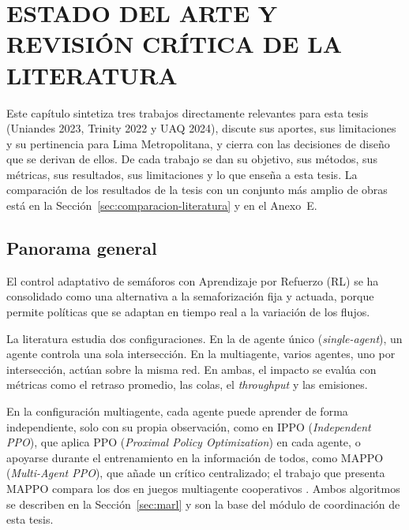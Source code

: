 \chapter{ESTADO DEL ARTE Y REVISIÓN CRÍTICA DE LA LITERATURA}
\label{cap:estado-arte}

Este capítulo sintetiza tres trabajos directamente relevantes para esta tesis (Uniandes 2023, Trinity 2022 y UAQ 2024), discute sus aportes, sus limitaciones y su pertinencia para Lima Metropolitana, y cierra con las decisiones de diseño que se derivan de ellos. De cada trabajo se dan su objetivo, sus métodos, sus métricas, sus resultados, sus limitaciones y lo que enseña a esta tesis. La comparación de los resultados de la tesis con un conjunto más amplio de obras está en la Sección~\ref{sec:comparacion-literatura} y en el Anexo~E.

\section{Panorama general}

El control adaptativo de semáforos con Aprendizaje por Refuerzo (RL) se ha consolidado como una alternativa a la semaforización fija y actuada, porque permite políticas que se adaptan en tiempo real a la variación de los flujos.

La literatura estudia dos configuraciones. En la de agente único (\textit{single-agent}), un agente controla una sola intersección. En la multiagente, varios agentes, uno por intersección, actúan sobre la misma red. En ambas, el impacto se evalúa con métricas como el retraso promedio, las colas, el \textit{throughput} y las emisiones.

En la configuración multiagente, cada agente puede aprender de forma independiente, solo con su propia observación, como en IPPO (\textit{Independent PPO}), que aplica PPO (\textit{Proximal Policy Optimization}) en cada agente, o apoyarse durante el entrenamiento en la información de todos, como MAPPO (\textit{Multi-Agent PPO}), que añade un crítico centralizado; el trabajo que presenta MAPPO compara los dos en juegos multiagente cooperativos \citep{Yu2021_MAPPO}. Ambos algoritmos se describen en la Sección~\ref{sec:marl} y son la base del módulo de coordinación de esta tesis.

